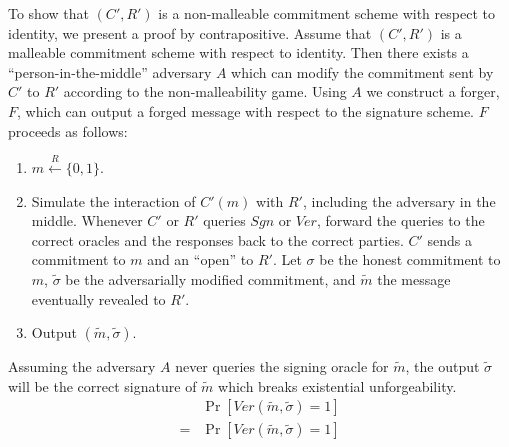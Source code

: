 \documentclass[draft]{article}
\newcommand{\getr}{\overset{R}{\gets}}
\newcommand{\getrsingle}{\getr\{0, 1\}}
\begin{document}
\begin{enumerate}
  To show that $(C', R')$ is a non-malleable commitment scheme with respect to identity, we present a proof by contrapositive.
  Assume that $(C', R')$ is a malleable commitment scheme with respect to identity.
  Then there exists a ``person-in-the-middle'' adversary $A$ which can modify the commitment sent by $C'$ to $R'$ according to the non-malleability game.
  Using $A$ we construct a forger, $F$, which can output a forged message with respect to the signature scheme.
  $F$ proceeds as follows:
  \begin{enumerate}
  \item $m\getrsingle$.
  \item
    Simulate the interaction of $C'(m)$ with $R'$, including the adversary in the middle.
    Whenever $C'$ or $R'$ queries $Sgn$ or $Ver$, forward the queries to the correct oracles and the responses back to the correct parties.
    $C'$ sends a commitment to $m$ and an ``open'' to $R'$.
    Let $\sigma$ be the honest commitment to $m$, $\tilde{\sigma}$ be the adversarially modified commitment, and $\tilde{m}$ the message eventually revealed to $R'$.
  \item Output $(\tilde{m}, \tilde{\sigma})$.
  \end{enumerate}
  Assuming the adversary $A$ never queries the signing oracle for $\tilde{m}$, the output $\tilde{\sigma}$ will be the correct signature of $\tilde{m}$ which breaks existential unforgeability.
  \begin{align*}
    & \Pr\left[Ver(\tilde{m}, \tilde{\sigma})=1\right] \\
  = & \Pr\left[Ver(\tilde{m}, \tilde{\sigma})=1\right]
  \end{align*}
\end{enumerate}
\end{document}
